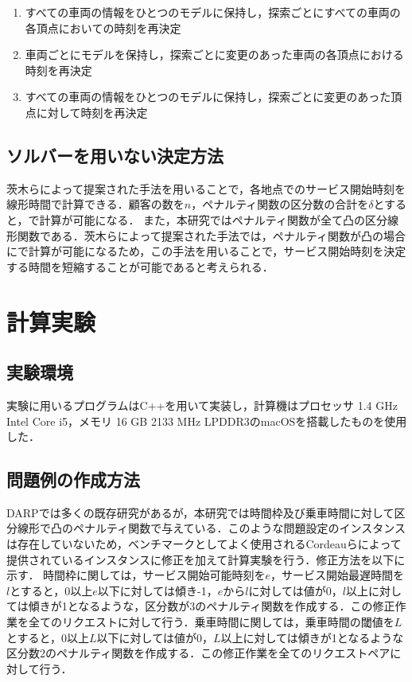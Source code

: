 \documentclass[a4j,11pt,twocolumn]{jsarticle}
\begin{document}
\begin{enumerate}
  \item すべての車両の情報をひとつのモデルに保持し，探索ごとにすべての車両の各頂点においての時刻を再決定
  \item 車両ごとにモデルを保持し，探索ごとに変更のあった車両の各頂点における時刻を再決定
  \item すべての車両の情報をひとつのモデルに保持し，探索ごとに変更のあった頂点に対して時刻を再決定
\end{enumerate}

\subsection{{\large ソルバーを用いない決定方法}}
茨木らによって提案された手法\cite{masuda}を用いることで，各地点でのサービス開始時刻を線形時間で計算できる．顧客の数を${n}$，ペナルティ関数の区分数の合計を${\delta}$とすると，で計算が可能になる．
また，本研究ではペナルティ関数が全て凸の区分線形関数である．茨木らによって提案された\cite{sobue}手法では，ペナルティ関数が凸の場合にで計算が可能になるため，この手法を用いることで，サービス開始時刻を決定する時間を短縮することが可能であると考えられる．

\section{計算実験}
\subsection{実験環境}
実験に用いるプログラムはC++を用いて実装し，計算機はプロセッサ 1.4 GHz Intel Core i5，メモリ 16 GB 2133 MHz LPDDR3のmacOSを搭載したものを使用した．
\subsection{問題例の作成方法}
DARPでは多くの既存研究があるが，本研究では時間枠及び乗車時間に対して区分線形で凸のペナルティ関数で与えている．このような問題設定のインスタンスは存在していないため，ベンチマークとしてよく使用されるCordeauらによって提供されている\cite{tabu}インスタンスに修正を加えて計算実験を行う．修正方法を以下に示す．
時間枠に関しては，サービス開始可能時刻を$e$，サービス開始最遅時間を$l$とすると，0以上$e$以下に対しては傾き-1，$e$から$l$に対しては値が0，$l$以上に対しては傾きが1となるような，区分数が3のペナルティ関数を作成する．この修正作業を全てのリクエストに対して行う．乗車時間に関しては，乗車時間の閾値を$L$とすると，0以上$L$以下に対しては値が0，$L$以上に対しては傾きが1となるような区分数2のペナルティ関数を作成する．この修正作業を全てのリクエストペアに対して行う．
\end{document}

